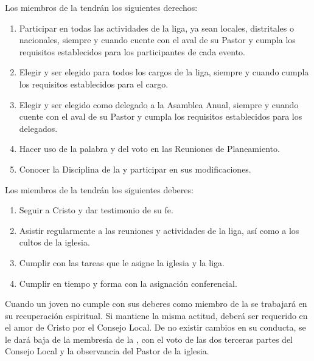 

\article
\label{derechos-miembros}
Los miembros de la \LMJ{} tendrán los siguientes derechos:
\begin{enumerate}[label=\alph*)]
    \item Participar en todas las actividades de la liga, ya sean locales, distritales o nacionales, siempre y cuando cuente con el aval de su Pastor y cumpla los requisitos establecidos para los participantes de cada evento.
    \item Elegir y ser elegido para todos los cargos de la liga, siempre y cuando cumpla los requisitos establecidos para el cargo.
    \item Elegir y ser elegido como delegado a la Asamblea Anual, siempre y cuando cuente con el aval de su Pastor y cumpla los requisitos establecidos para los delegados.
    \item Hacer uso de la palabra y del voto en las Reuniones de Planeamiento.
    \item Conocer la Disciplina de la \LMJ{} y participar en sus modificaciones.
\end{enumerate}

\article
\label{deberes-miembros}
Los miembros de la \LMJ{} tendrán los siguientes deberes:
\begin{enumerate}[label=\alph*)]
    \item Seguir a Cristo y dar testimonio de su fe.
    \item Asistir regularmente a las reuniones y actividades de la liga, así como a los cultos de la iglesia.
    \item Cumplir con las tareas que le asigne la iglesia y la liga.
    \item Cumplir en tiempo y forma con la asignación conferencial.
\end{enumerate}

\article
Cuando un joven no cumple con sus deberes como miembro de la \LMJ{} se trabajará en su recuperación espiritual. Si mantiene la misma actitud, deberá ser requerido en el amor de Cristo por el Consejo Local. De no existir cambios en su conducta, se le dará baja de la membresía de la \LMJ{}, con el voto de las dos terceras partes del Consejo Local y la observancia del Pastor de la iglesia.
